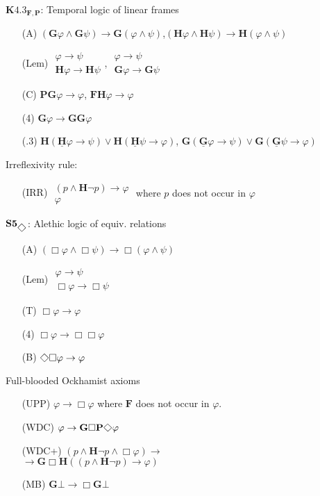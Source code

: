 \documentclass[xcolor=x11names]{beamer}
\newcommand{\bemph}[1] {{\color{DeepSkyBlue3}{#1}}}
\newcommand{\FD}{\mathbf F}
\newcommand{\FB}{\mathbf G}
\newcommand{\PD}{\mathbf P}
\newcommand{\PB}{\mathbf H}
\newcommand{\FBDot}{\underline{\mathbf G}}
\newcommand{\PBDot}{\underline{\mathbf H}}
\renewcommand{\Diamond}{\scalebox{.9}{\raisebox{-.4ex}{\rotatebox{45}{$\Box$}}}}
\newcommand{\lrule}[3][c]{\begin{array}{#1} #2  \\  \hline #3 \end{array}}
\newcommand{\lthen}{\rightarrow}
\newcommand{\magyi}[1]{\textup{\bemph{\tiny #1}}}
\begin{document}
\begin{frame}[t]
\begin{minipage}[t]{5.78cm}
$\mathbf{K4.3_{\FD, \PD}}$: {Temporal logic of linear frames}
\begin{itemize}
\item[(A)] $(\FB\varphi \land \FB \psi )\lthen \FB(\varphi \land \psi )$,\quad  $(\PB\varphi \land \PB \psi )\lthen \PB(\varphi \land \psi )$
\item[(Lem)] $\lrule{\varphi\lthen \psi}{\PB\varphi \lthen \PB\psi}$, \quad $\lrule{\varphi\lthen \psi}{\FB\varphi \lthen \FB\psi}$
\item[(C)] $\PD\FB\varphi \lthen \varphi $, \quad  $\FD\PB\varphi \lthen \varphi$
\item[(4)] $\FB\varphi\lthen \FB\FB\varphi$
\item[(.3)] $\PB(\PBDot \varphi\lthen \psi ) \lor \PB(\PBDot \psi\lthen \varphi )$, \quad $\FB(\FBDot \varphi\lthen \psi ) \lor \FB(\FBDot \psi\lthen \varphi )$
\end{itemize}
\pause %
\bemph{\hrule}
\smallskip
Irreflexivity rule:
\begin{itemize}
\item[(IRR)] $\lrule{(p\land \mathbf H \lnot p) \lthen \varphi}{\varphi}$  \textup{\tiny where $p$ does not occur in $\varphi$}
\end{itemize}
\end{minipage}\quad
\begin{minipage}[t]{4.7cm}
\pause
$\mathbf{S5}_{\Diamond}$: {Alethic
logic of equiv. relations}
\begin{itemize}
\item[(A)] $(\Box\varphi \land \Box \psi )\lthen \Box(\varphi \land \psi )$
\item[(Lem)] $\lrule{\varphi\lthen \psi}{\Box\varphi \lthen \Box\psi}$
\item[(T)] $\Box \varphi \lthen \varphi$
\item[(4)] $\Box \varphi\lthen \Box \Box \varphi$
\item[(B)] $\Diamond \Box \varphi \lthen \varphi$
\end{itemize}
\pause %
\bemph{\hrule}
\smallskip
Full-blooded Ockhamist axioms
\begin{itemize}
\item[(UPP)] $ \varphi \lthen \Box \varphi $ {\tiny where $\FD $ does not occur in $\varphi$}.\\ \hfill \magyi{unpreventability of past}
\item[(WDC)] $ \varphi\lthen \FB \Box \PD \Diamond \varphi$ \\ \hfill \magyi{weak diagram completion}
\item[(WDC+)]$ (p \land \PB \lnot p \land \Box \varphi) \lthen $ \\ \hfill $\lthen \FB \Box \PB ((p \land \PB \lnot p) \lthen \varphi)$
\item[(MB)]  $ \FB \bot \lthen \Box \FB \bot $ \hfill \magyi{maximality of branches}
\end{itemize}
\end{minipage}
\end{frame}
\end{document}
